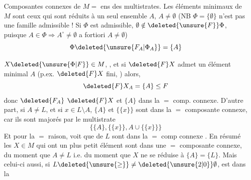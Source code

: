 
Composantes connexes de $M=$ ens des multistrates. Les éléments minimaux de $M$ sont ceux qui sont réduits à un seul ensemble $A$,  $A\ne\emptyset$ (NB $\Phi=\{\emptyset\}$ n'est pas une famille admissible !\deleted{)} Si $\Phi$ est admissible, $\emptyset\notin\deleted{\unsure{F}}\Phi$, \deleted{)} puisque $A\in\Phi\Rightarrow A^{\circ}\ne\emptyset$ a fortiori $A\ne\emptyset$)
\[
\Phi\deleted{\unsure{F_{A}|\Phi_{A}}}=\{A\}
\]

 

 $X\deleted{\unsure{\Phi|F}}\in M$,  , et si $\deleted{F}X$ admet un  élément minimal $A$ (p.ex. $\deleted{F}X$ fini, ) alors,
\[
\deleted{F}X_A=\{A\}\leq F
\]
 donc $\deleted{F_A}$  $\deleted{F}X$ et $\{A\}$ dans la $=$ comp. connexe. D'autre part,  si $A\ne L$, et si $x\in L\setminus A$, $\{A\}$ et $\{\{x\}\}$ sont dans la $=$ composante connexe, car ils sont majorés par le multistrate
\[
\bigl\{\{A\},\{\{x\}\},A\cup\{\{x\}\}\bigr\}
\]
 Et pour la $=$ raison,    voit que    de $L$ sont dans la $=$ comp connexe . En résumé les $X\in M$ qui ont un plus petit élément  sont dans une $=$ composante connexe, du moment que $A\ne L$ i.e. du moment que $X$ ne se réduise à $\{A\}=\{L\}$. Mais celui-ci aussi, si  $L\deleted{\unsure{\geq}}\ne\deleted{\unsure{2|0}}\emptyset$, est dans la
